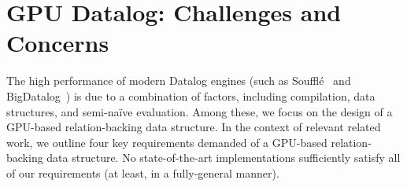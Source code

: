 \documentclass[nonacm,sigplan]{acmart}
\newcommand{\kris}[1]{{\textcolor{red}{\{\textbf{Kris}: #1\}}}}
\begin{document}



\section{GPU Datalog: Challenges and Concerns}
\label{sec:motivation}


The high performance of modern Datalog engines (such as Souffl\'e~\cite{jordan2016souffle} and BigDatalog~\cite{shkapsky2016big}) is due to a combination of factors, including compilation, data structures, and semi-na\"ive evaluation. Among these, we focus on the design of a GPU-based relation-backing data structure. In the context of relevant related work, we outline four key requirements demanded of a GPU-based relation-backing data structure. No state-of-the-art implementations sufficiently satisfy all of our requirements (at least, in a fully-general manner).




\end{document}
